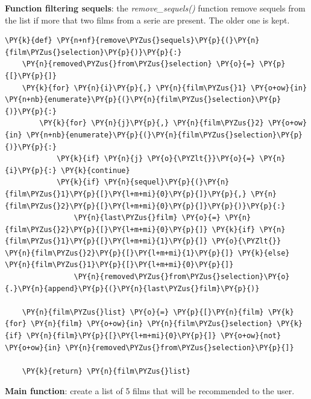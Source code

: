    \textbf{Function filtering sequels}: the \emph{remove\_sequels()}
function remove sequels from the list if more that two films from a
serie are present. The older one is kept.

    \begin{tcolorbox}[breakable, size=fbox, boxrule=1pt, pad at break*=1mm,colback=cellbackground, colframe=cellborder]
\begin{Verbatim}[commandchars=\\\{\}]
\PY{k}{def} \PY{n+nf}{remove\PYZus{}sequels}\PY{p}{(}\PY{n}{film\PYZus{}selection}\PY{p}{)}\PY{p}{:}    
    \PY{n}{removed\PYZus{}from\PYZus{}selection} \PY{o}{=} \PY{p}{[}\PY{p}{]}
    \PY{k}{for} \PY{n}{i}\PY{p}{,} \PY{n}{film\PYZus{}1} \PY{o+ow}{in} \PY{n+nb}{enumerate}\PY{p}{(}\PY{n}{film\PYZus{}selection}\PY{p}{)}\PY{p}{:}
        \PY{k}{for} \PY{n}{j}\PY{p}{,} \PY{n}{film\PYZus{}2} \PY{o+ow}{in} \PY{n+nb}{enumerate}\PY{p}{(}\PY{n}{film\PYZus{}selection}\PY{p}{)}\PY{p}{:}
            \PY{k}{if} \PY{n}{j} \PY{o}{\PYZlt{}}\PY{o}{=} \PY{n}{i}\PY{p}{:} \PY{k}{continue} 
            \PY{k}{if} \PY{n}{sequel}\PY{p}{(}\PY{n}{film\PYZus{}1}\PY{p}{[}\PY{l+m+mi}{0}\PY{p}{]}\PY{p}{,} \PY{n}{film\PYZus{}2}\PY{p}{[}\PY{l+m+mi}{0}\PY{p}{]}\PY{p}{)}\PY{p}{:} 
                \PY{n}{last\PYZus{}film} \PY{o}{=} \PY{n}{film\PYZus{}2}\PY{p}{[}\PY{l+m+mi}{0}\PY{p}{]} \PY{k}{if} \PY{n}{film\PYZus{}1}\PY{p}{[}\PY{l+m+mi}{1}\PY{p}{]} \PY{o}{\PYZlt{}} \PY{n}{film\PYZus{}2}\PY{p}{[}\PY{l+m+mi}{1}\PY{p}{]} \PY{k}{else} \PY{n}{film\PYZus{}1}\PY{p}{[}\PY{l+m+mi}{0}\PY{p}{]}
                \PY{n}{removed\PYZus{}from\PYZus{}selection}\PY{o}{.}\PY{n}{append}\PY{p}{(}\PY{n}{last\PYZus{}film}\PY{p}{)}

    \PY{n}{film\PYZus{}list} \PY{o}{=} \PY{p}{[}\PY{n}{film} \PY{k}{for} \PY{n}{film} \PY{o+ow}{in} \PY{n}{film\PYZus{}selection} \PY{k}{if} \PY{n}{film}\PY{p}{[}\PY{l+m+mi}{0}\PY{p}{]} \PY{o+ow}{not} \PY{o+ow}{in} \PY{n}{removed\PYZus{}from\PYZus{}selection}\PY{p}{]}

    \PY{k}{return} \PY{n}{film\PYZus{}list}   
\end{Verbatim}
\end{tcolorbox}

    \textbf{Main function}: create a list of 5 films that will be
recommended to the user.

